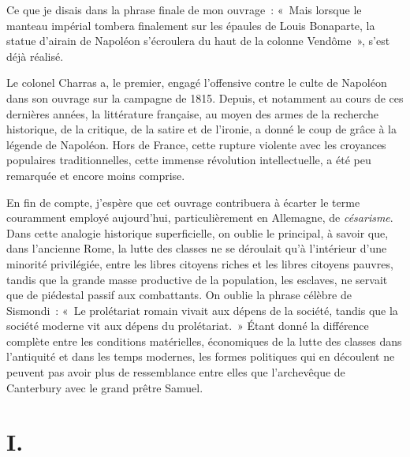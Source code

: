 \documentclass[french,twoside]{book} %
\newcommand{\dateline}[1]{\medskip{\RaggedLeft{#1}\par}\bigskip}
\newcommand\chapteropen{} %
\begin{document}
Ce que je disais dans la phrase finale de mon ouvrage : « Mais lorsque le manteau impérial tombera finalement sur les épaules de Louis Bonaparte, la statue d’airain de Napoléon s’écroulera du haut de la colonne Vendôme », s’est déjà réalisé.\par
Le colonel Charras a, le premier, engagé l’offensive contre le culte de Napoléon dans son ouvrage sur la campagne de 1815. Depuis, et notamment au cours de ces dernières années, la littérature française, au moyen des armes de la recherche historique, de la critique, de la satire et de l’ironie, a donné le coup de grâce à la légende de Napoléon. Hors de France, cette rupture violente avec les croyances populaires traditionnelles, cette immense révolution intellectuelle, a été peu remarquée et encore moins comprise.\par
En fin de compte, j’espère que cet ouvrage contribuera à écarter le terme couramment employé aujourd’hui, particulièrement en Allemagne, de \emph{césarisme}. Dans cette analogie historique superficielle, on oublie le principal, à savoir que, dans l’ancienne Rome, la lutte des classes ne se déroulait qu’à l’intérieur d’une minorité privilégiée, entre les libres citoyens riches et les libres citoyens pauvres, tandis que la grande masse productive de la population, les esclaves, ne servait que de piédestal passif aux combattants. On oublie la phrase célèbre de Sismondi : « Le prolétariat romain vivait aux dépens de la société, tandis que la société moderne vit aux dépens du prolétariat. » Étant donné la différence complète entre les conditions matérielles, économiques de la lutte des classes dans l’antiquité et dans les temps modernes, les formes politiques qui en découlent ne peuvent pas avoir plus de ressemblance entre elles que l’archevêque de Canterbury avec le grand prêtre Samuel.\par

\dateline{Londres, 23 juin 1869. \\
Karl Marx}

\chapteropen
\chapter[I.]{I.}\renewcommand{\leftmark}{I.}
\end{document}
